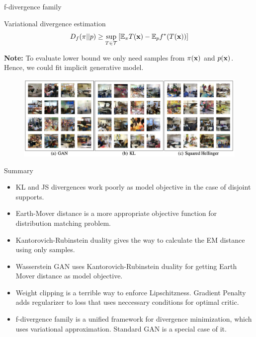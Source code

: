 \begin{frame}{f-divergence family}
	\begin{block}{Variational divergence estimation}
		\[
			D_f(\pi || p) \geq \sup_{T \in \mathcal{T}} \left[\mathbb{E}_{\pi}T(\mathbf{x}) -  \mathbb{E}_p f^*(T(\mathbf{x})) \right]
		\]
	\end{block}
	\textbf{Note:} To evaluate lower bound we only need samples from $\pi(\mathbf{x})$ and $p(\mathbf{x})$. Hence, we could fit implicit generative model.
	\begin{figure}
		\centering
		\includegraphics[width=1.0\linewidth]{figs/f_div_results}
	\end{figure}

\end{frame}
\begin{frame}{Summary}
	\begin{itemize}
		\item KL and JS divergences work poorly as model objective in the case of disjoint supports.
		\vfill
		\item Earth-Mover distance is a more appropriate objective function for distribution matching problem.	
		\vfill
		\item Kantorovich-Rubinstein duality gives the way to calculate the EM distance using only samples.
		\vfill
		\item Wasserstein GAN uses Kantorovich-Rubinstein duality for getting Earth Mover distance as model objective.
		\vfill
		\item Weight clipping is a terrible way to enforce Lipschitzness. Gradient Penalty adds regularizer to loss that uses neccessary conditions for optimal critic. 	
		\vfill
		\item f-divergence family is a unified framework for divergence minimization, which uses variational approximation. Standard GAN is a special case of it.
	\end{itemize}
\end{frame}
 